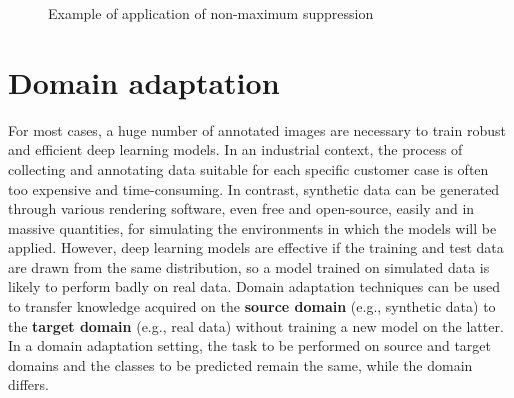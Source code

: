 \documentclass[%
    corpo=12pt,
    twoside,
    stile=classica,   
    tipotesi=magistrale,
    evenboxes,
    english,
	numerazioneromana,
]{toptesi}
\begin{document}
\begin{figure}[ht]
	\centering
	\caption{Example of application of non-maximum suppression}
	\label{fig:nms}
\end{figure}


\section{Domain adaptation}


For most cases, a huge number of annotated images are necessary to train robust and efficient deep learning models. In an industrial context, the process of collecting and annotating data suitable for each specific customer case is often too expensive and time-consuming. In contrast, synthetic data can be generated through various rendering software, even free and open-source, easily and in massive quantities, for simulating the environments in which the models will be applied. However, deep learning models are effective if the training and test data are drawn from the same distribution, so a model trained on simulated data is likely to perform badly on real data. Domain adaptation techniques can be used to transfer knowledge acquired on the \textbf{source domain} (e.g., synthetic data) to the \textbf{target domain} (e.g., real data) without training a new model on the latter. In a domain adaptation setting, the task to be performed on source and target domains and the classes to be predicted remain the same, while the domain differs.
\end{document}
